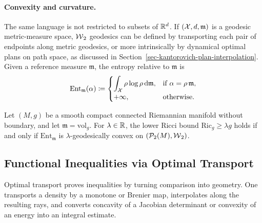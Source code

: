 \paragraph{Convexity and curvature.}
The same language is not restricted to subsets of $\mathbb{R}^d$. If $(\mathcal{X},d,\mathfrak m)$ is a geodesic metric-measure space, $\operatorname{\mathcal{W}}_2$ geodesics can be defined by transporting each pair of endpoints along metric geodesics, or more intrinsically by dynamical optimal plans on path space, as discussed in Section~\ref{sec-kantorovich-plan-interpolation}. Given a reference measure $\mathfrak m$, the entropy relative to $\mathfrak m$ is
\[
\mathrm{Ent}_{\mathfrak m}(\alpha)
\coloneqq
\begin{cases}
\displaystyle \int_{\mathcal{X}} \rho\log\rho\,\mathrm{d}\mathfrak m,
& \text{if } \alpha=\rho\,\mathfrak m,\\
+\infty,
& \text{otherwise.}
\end{cases}
\]
\begin{thm}\label{thm-ricci-entropy-convexity}
Let $(M,g)$ be a smooth compact connected Riemannian manifold without boundary, and let $\mathfrak m=\mathrm{vol}_g$. For $\lambda\in\mathbb{R}$, the lower Ricci bound $\mathrm{Ric}_g\geq\lambda g$ holds if and only if $\mathrm{Ent}_{\mathfrak m}$ is $\lambda$-geodesically convex on $(\mathcal{P}_2(M),\operatorname{\mathcal{W}}_2)$.
\end{thm}
\subsection{Functional Inequalities via Optimal Transport}
Optimal transport proves inequalities by turning comparison into geometry. One transports a density by a monotone or Brenier map, interpolates along the resulting rays, and converts concavity of a Jacobian determinant or convexity of an energy into an integral estimate.

